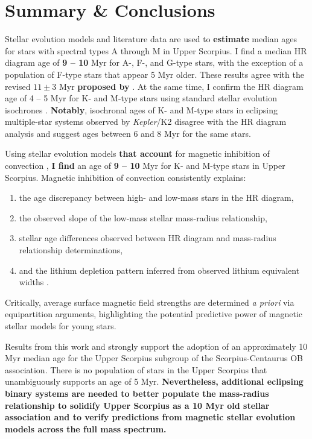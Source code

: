 \documentclass{aa}
\begin{document}
\section{Summary \& Conclusions}
\label{sec:tellit}
Stellar evolution models and literature data are used to {\bf estimate} median ages for stars with spectral types A through M in Upper Scorpius. I find a median HR diagram age of {\bf 9 -- 10} Myr for A-, F-, and G-type stars, with the exception of a population of F-type stars that appear 5 Myr older. These results agree with the revised $11\pm3$ Myr {\bf proposed by} \citet{Pecaut2012}. At the same time, I confirm the HR diagram age of 4 -- 5 Myr for K- and M-type stars using standard stellar evolution isochrones \citep{Preibisch2012, Slesnick2008, Herczeg2015}. {\bf Notably}, isochronal ages of K- and M-type stars in eclipsing multiple-star systems observed by \emph{Kepler}/K2 \citep{Kraus2015, Alonso2015, David2015b} disagree with the HR diagram analysis and suggest ages between 6 and 8 Myr for the same stars.

Using stellar evolution models {\bf that account} for magnetic inhibition of convection \citep{FC12b, FC13}, {\bf I find} an age of {\bf 9 -- 10} Myr for K- and M-type stars in Upper Scorpius. Magnetic inhibition of convection consistently explains:
\begin{enumerate} 
	\item the age discrepancy between high- and low-mass stars in the HR diagram,
	\item the observed slope of the low-mass stellar mass-radius relationship,
	\item stellar age differences observed between HR diagram and mass-radius relationship determinations,
	\item and the lithium depletion pattern inferred from observed lithium equivalent widths \citep{Rizzuto2015}. 
\end{enumerate}
Critically, average surface magnetic field strengths are determined \emph{a priori} via equipartition arguments, highlighting the potential predictive power of magnetic stellar models for young stars.

Results from this work and \citet{Pecaut2012} strongly support the adoption of an approximately 10 Myr median age for the Upper Scorpius subgroup of the Scorpius-Centaurus OB association. There is no population of stars in the Upper Scorpius that unambiguously supports an age of 5 Myr. {\bf Nevertheless, additional eclipsing binary systems are needed to better populate the mass-radius relationship to solidify Upper Scorpius as a 10 Myr old stellar association and to verify predictions from magnetic stellar evolution models across the full mass spectrum.}
\end{document}
